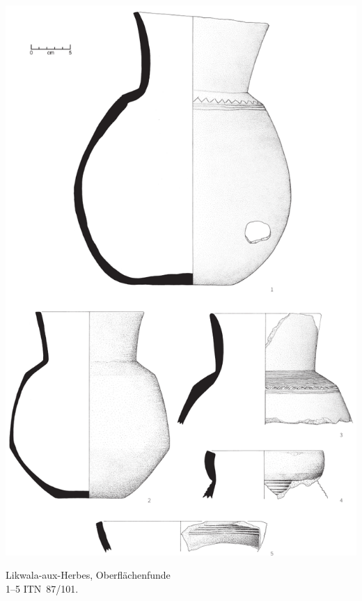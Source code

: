 \begin{pl}[H]
	\includegraphics{plt/Taf95.pdf}
	\vspace{.75em}\caption{Likwala-aux-Herbes, Oberflächenfunde \\ 1--5 ITN~87/101.}
	\label{pl:95}
\end{pl}

